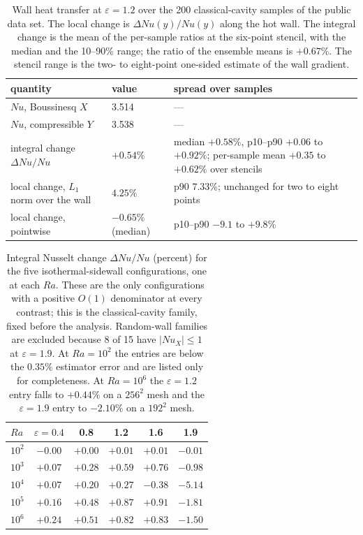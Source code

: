 \documentclass[preprint,11pt,a4paper,times,doubleblind]{elsarticle}
\begin{document}
\begin{table}[htbp]
\centering
\footnotesize
\setlength{\tabcolsep}{4pt}
\caption{Wall heat transfer at $\varepsilon=1.2$ over the 200 classical-cavity samples of the
public data set. The local change is $\Delta Nu(y)/Nu(y)$ along the hot wall. The integral change is
the mean of the per-sample ratios at the six-point stencil, with the median and the 10--90\% range;
the ratio of the ensemble means is $+0.67\%$. The stencil range is the two- to eight-point
one-sided estimate of the wall gradient.}
\label{tab:nu}
\begin{tabular}{@{}p{4.4cm}p{2.5cm}p{5.2cm}@{}}
\toprule
quantity & value & spread over samples\\
\midrule
$Nu$, Boussinesq $X$ & 3.514 & ---\\
$Nu$, compressible $Y$ & 3.538 & ---\\
integral change $\Delta Nu/Nu$ & $+0.54\%$ & median $+0.58\%$, p10--p90 $+0.06$ to $+0.92\%$; per-sample mean $+0.35$ to $+0.62\%$ over stencils\\
local change, $L_1$ norm over the wall & $4.25\%$ & p90 $7.33\%$; unchanged for two to eight points\\
local change, pointwise & $-0.65\%$ (median) & p10--p90 $-9.1$ to $+9.8\%$\\
\bottomrule
\end{tabular}
\end{table}

\begin{table}[htbp]
\centering
\footnotesize
\setlength{\tabcolsep}{5pt}
\caption{Integral Nusselt change $\Delta Nu/Nu$ (percent) for the five isothermal-sidewall
configurations, one at each $Ra$. These are the only configurations with a positive $O(1)$
denominator at every contrast; this is the classical-cavity family, fixed before the analysis.
Random-wall families are excluded because 8 of 15 have $|Nu_X|\le1$ at $\varepsilon=1.9$. At
$Ra=10^2$ the entries are below the $0.35\%$ estimator error and are listed only for
completeness. At $Ra=10^6$ the $\varepsilon=1.2$ entry falls to $+0.44\%$ on a $256^2$ mesh and the
$\varepsilon=1.9$ entry to $-2.10\%$ on a $192^2$ mesh.}
\label{tab:nu_ra}
\begin{tabular}{@{}lccccc@{}}
\toprule
$Ra$ & $\varepsilon=0.4$ & 0.8 & 1.2 & 1.6 & 1.9\\
\midrule
$10^2$ & $-0.00$ & $+0.00$ & $+0.01$ & $+0.01$ & $-0.01$\\
$10^3$ & $+0.07$ & $+0.28$ & $+0.59$ & $+0.76$ & $-0.98$\\
$10^4$ & $+0.07$ & $+0.20$ & $+0.27$ & $-0.38$ & $-5.14$\\
$10^5$ & $+0.16$ & $+0.48$ & $+0.87$ & $+0.91$ & $-1.81$\\
$10^6$ & $+0.24$ & $+0.51$ & $+0.82$ & $+0.83$ & $-1.50$\\
\bottomrule
\end{tabular}
\end{table}
\end{document}
